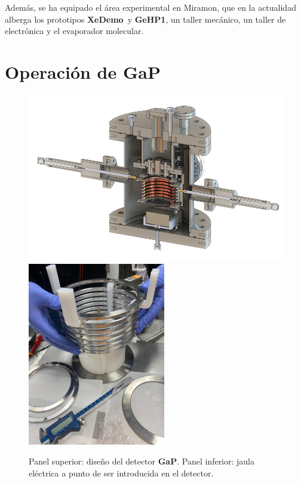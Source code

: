 \documentclass[12pt,a4paper,article]{report} %
\def\xed{{\bf XeDemo}}
\def\ged{{\bf GeHP1}}
\def\gap{{\bf GaP}}
\begin{document}
Además, se ha equipado el área experimental en Miramon,  que en la actualidad alberga los prototipos \xed\ y \ged, un taller mecánico, un taller de electrónica y el evaporador  molecular. 


\section*{Operación de \gap}
\begin{figure}[bht!]
\begin{center}
\includegraphics[width=12cm]{img/gap.png}
\includegraphics[width=6cm]{img/gap-fc.png}
\caption{Panel superior: diseño del detector \gap. Panel inferior: jaula eléctrica a punto de ser introducida en el detector.}
\label{fig:gap}
\end{center}
\end{figure}
\end{document}
